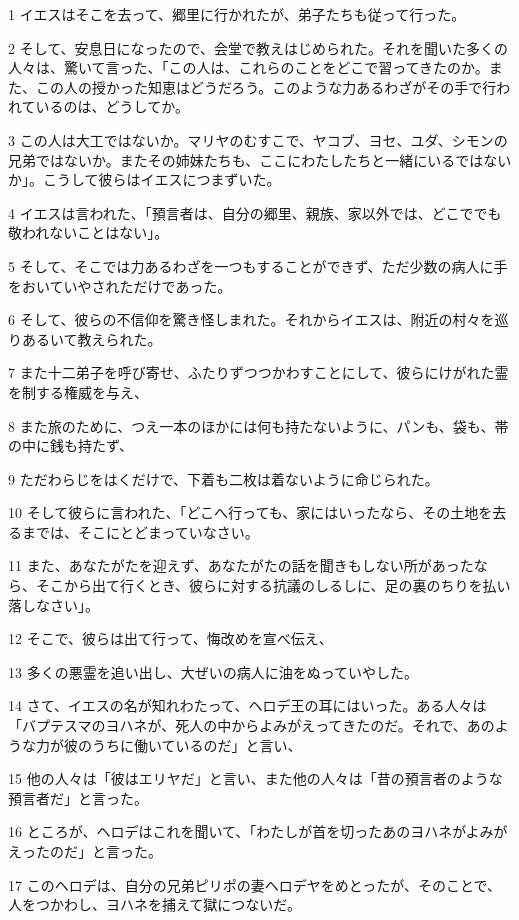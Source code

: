 \par 1 イエスはそこを去って、郷里に行かれたが、弟子たちも従って行った。
\par 2 そして、安息日になったので、会堂で教えはじめられた。それを聞いた多くの人々は、驚いて言った、「この人は、これらのことをどこで習ってきたのか。また、この人の授かった知恵はどうだろう。このような力あるわざがその手で行われているのは、どうしてか。
\par 3 この人は大工ではないか。マリヤのむすこで、ヤコブ、ヨセ、ユダ、シモンの兄弟ではないか。またその姉妹たちも、ここにわたしたちと一緒にいるではないか」。こうして彼らはイエスにつまずいた。
\par 4 イエスは言われた、「預言者は、自分の郷里、親族、家以外では、どこででも敬われないことはない」。
\par 5 そして、そこでは力あるわざを一つもすることができず、ただ少数の病人に手をおいていやされただけであった。
\par 6 そして、彼らの不信仰を驚き怪しまれた。それからイエスは、附近の村々を巡りあるいて教えられた。
\par 7 また十二弟子を呼び寄せ、ふたりずつつかわすことにして、彼らにけがれた霊を制する権威を与え、
\par 8 また旅のために、つえ一本のほかには何も持たないように、パンも、袋も、帯の中に銭も持たず、
\par 9 ただわらじをはくだけで、下着も二枚は着ないように命じられた。
\par 10 そして彼らに言われた、「どこへ行っても、家にはいったなら、その土地を去るまでは、そこにとどまっていなさい。
\par 11 また、あなたがたを迎えず、あなたがたの話を聞きもしない所があったなら、そこから出て行くとき、彼らに対する抗議のしるしに、足の裏のちりを払い落しなさい」。
\par 12 そこで、彼らは出て行って、悔改めを宣べ伝え、
\par 13 多くの悪霊を追い出し、大ぜいの病人に油をぬっていやした。
\par 14 さて、イエスの名が知れわたって、ヘロデ王の耳にはいった。ある人々は「バプテスマのヨハネが、死人の中からよみがえってきたのだ。それで、あのような力が彼のうちに働いているのだ」と言い、
\par 15 他の人々は「彼はエリヤだ」と言い、また他の人々は「昔の預言者のような預言者だ」と言った。
\par 16 ところが、ヘロデはこれを聞いて、「わたしが首を切ったあのヨハネがよみがえったのだ」と言った。
\par 17 このヘロデは、自分の兄弟ピリポの妻ヘロデヤをめとったが、そのことで、人をつかわし、ヨハネを捕えて獄につないだ。
